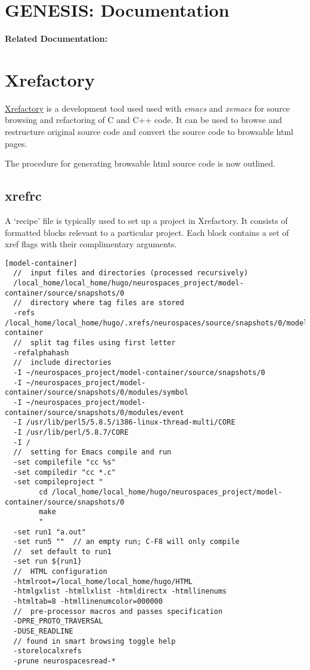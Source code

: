 \documentclass[12pt]{article}
\begin{document}
\section*{GENESIS: Documentation}

{\bf Related Documentation:}

\section*{Xrefactory}

\href{http://www.xref.sk/xrefactory/main.html}{Xrefactory} is a development tool used used with {\it emacs} and {\it xemacs} for source browsing and refactoring of C and C++ code. It can be used to browse and restructure original source code and convert the source code to browsable html pages.

The procedure for generating browsable html source code is now outlined.

\subsection*{xrefrc}

A `recipe' file is typically used to set up a project in Xrefactory. It consists of formatted blocks relevant to a particular project. Each block contains a set of xref flags with their complimentary arguments. 

\begin{verbatim}
[model-container]
  //  input files and directories (processed recursively)
  /local_home/local_home/hugo/neurospaces_project/model-container/source/snapshots/0
  //  directory where tag files are stored
  -refs /local_home/local_home/hugo/.xrefs/neurospaces/source/snapshots/0/model-container
  //  split tag files using first letter
  -refalphahash
  //  include directories
  -I ~/neurospaces_project/model-container/source/snapshots/0
  -I ~/neurospaces_project/model-container/source/snapshots/0/modules/symbol
  -I ~/neurospaces_project/model-container/source/snapshots/0/modules/event
  -I /usr/lib/perl5/5.8.5/i386-linux-thread-multi/CORE
  -I /usr/lib/perl/5.8.7/CORE
  -I /
  //  setting for Emacs compile and run
  -set compilefile "cc %s"
  -set compiledir "cc *.c"
  -set compileproject "
        cd /local_home/local_home/hugo/neurospaces_project/model-container/source/snapshots/0
        make
        "
  -set run1 "a.out"
  -set run5 ""  // an empty run; C-F8 will only compile
  //  set default to run1
  -set run ${run1}
  //  HTML configuration
  -htmlroot=/local_home/local_home/hugo/HTML
  -htmlgxlist -htmllxlist -htmldirectx -htmllinenums
  -htmltab=8 -htmllinenumcolor=000000
  //  pre-processor macros and passes specification
  -DPRE_PROTO_TRAVERSAL
  -DUSE_READLINE
  // found in smart browsing toggle help
  -storelocalxrefs
  -prune neurospacesread-*
\end{verbatim}  
  
\end{document}
